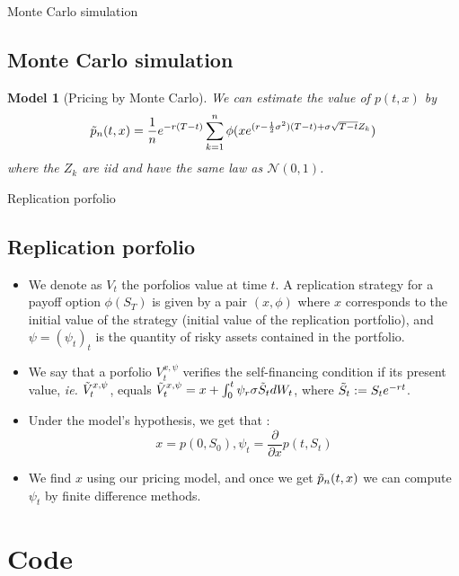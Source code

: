 \documentclass{beamer}
\newtheorem{model}{Model}
\begin{document}
\begin{frame}{Monte Carlo simulation}
\subsection{Monte Carlo simulation}
    \begin{model}[Pricing by Monte Carlo]
         We can estimate the value of $p(t,x)$ by 
    \begin{equation}
        \Tilde{p}_n(t,x) = \frac{1}{n}e^{-r(T-t)} \sum_{k=1}^n \phi(xe^{(r-\frac{1}{2}\sigma^2)(T-t) + \sigma \sqrt{T-t}Z_k})
    \end{equation}
    where the $Z_k$ are iid and have the same law as $\mathcal{N}(0,1)$.
    \end{model}
\end{frame}
\begin{frame}{Replication porfolio}
\subsection{Replication porfolio}
\begin{itemize}
    \item 
      We denote as $V_t$ the porfolios value at time $t$. A replication strategy for a payoff option $\phi(S_T)$ is given by a pair $(x, \phi)$ where $x$ corresponds to the initial value of the strategy (initial value of the replication portfolio), and $\psi= (\psi_t)_t$ is the quantity of risky assets contained in the portfolio. 
    \item   We say that a porfolio $V_t^{x, \psi}$ verifies the self-financing condition if its present value, \textit{ie.} $\Tilde{V}_t^{x,\psi}$, equals $ \Tilde{V}_t^{x,\psi}= x + \int_0^t \psi_r \sigma \Tilde{S}_t dW_t$, where $\Tilde{S}_t := S_t e^{-rt}$.
    \\
     \item  Under the model's hypothesis, we get that  :
    $$x= p(0,S_0), \psi_t = \frac{\partial }{\partial x}p(t,S_t)$$
    \item We find $x$ using our pricing model, and once we get $\Tilde{p}_n(t,x)$ we can compute $\psi_t$ by finite difference methods. 
    \end{itemize}
\end{frame}
\section{Code}
\end{document}
